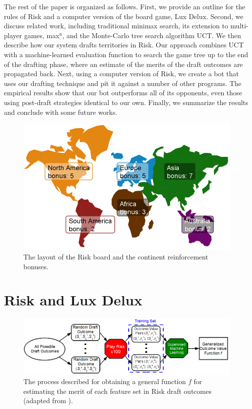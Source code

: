 \documentclass[letterpaper]{article}
\numberwithin{equation}{section}
\numberwithin{theorem}{section}
\numberwithin{lemma}{section}
\numberwithin{df}{section}
\begin{document}
The rest of the paper is organized as follows.  First, we provide an outline for the rules of Risk and a computer version of the board game, Lux Delux.  Second, we discuss related work, including traditional minimax search, its extension to multi-player games, max$^\text{n}$, and the Monte-Carlo tree search algorithm UCT.  We then describe how our system drafts territories in Risk.  Our approach combines UCT with a machine-learned evaluation function to search the game tree up to the end of the drafting phase, where an estimate of the merits of the draft outcomes are propagated back.  Next, using a computer version of Risk, we create a bot that uses our drafting technique and pit it against a number of other programs.  The empirical results show that our bot outperforms all of its opponents, even those using post-draft strategies identical to our own.  Finally, we summarize the results and conclude with some future works.

\begin{figure}[t]
	\centering
	\includegraphics[scale=0.325]{../ForPublication/figs/Conts.png}
	\caption{The layout of the Risk board and the continent reinforcement bonuses.}
	\label{fig:Conts}
\end{figure}

\section{Risk and Lux Delux}
\label{sec:Prob}

\begin{figure}[t]
	\centering
	\includegraphics[scale=0.54]{../ForPublication/figs/MachineLearner.png}
	\caption{The process described for obtaining a general function $f$ for estimating the merit of each feature set in Risk draft outcomes (adapted from \cite[Figure 5.1]{GregLeeThesis}).}
	\label{fig:MachLearn}
\end{figure} 
\end{document}
